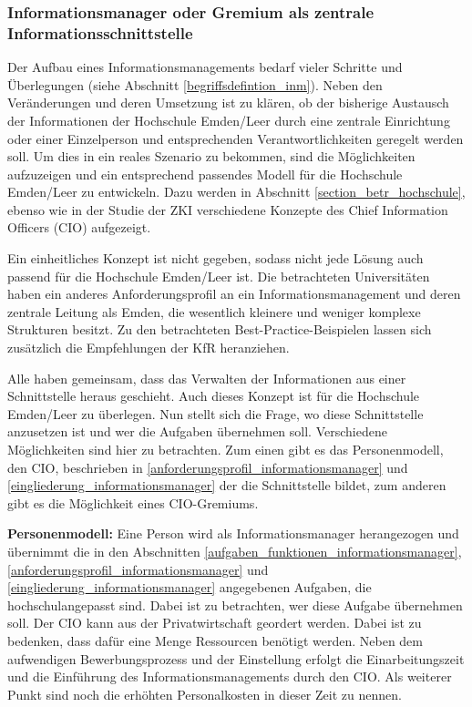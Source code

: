 \subsubsection{Informationsmanager oder Gremium als zentrale Informationsschnittstelle}
\label{subsubsection_cio_gremium}

Der Aufbau eines Informationsmanagements bedarf vieler Schritte und Überlegungen (siehe Abschnitt \ref{begriffsdefintion_inm}). Neben den Veränderungen und deren Umsetzung ist zu klären, ob der bisherige Austausch der Informationen der Hochschule Emden/Leer durch eine zentrale Einrichtung oder einer Einzelperson und entsprechenden Verantwortlichkeiten geregelt werden soll. Um dies in ein reales Szenario zu bekommen, sind die Möglichkeiten aufzuzeigen und ein entsprechend passendes Modell für die Hochschule Emden/Leer zu entwickeln. Dazu werden in Abschnitt  \ref{section_betr_hochschule}, ebenso wie in der Studie der ZKI verschiedene Konzepte des Chief Information Officers (CIO) aufgezeigt. 

Ein einheitliches Konzept ist nicht gegeben, sodass nicht jede Lösung auch passend für die Hochschule Emden/Leer ist. Die betrachteten Universitäten haben ein anderes Anforderungsprofil an ein Informationsmanagement und deren zentrale Leitung als Emden, die wesentlich kleinere und weniger komplexe Strukturen besitzt. Zu den betrachteten Best-Practice-Beispielen lassen sich zusätzlich die Empfehlungen der KfR heranziehen. 

Alle haben gemeinsam, dass das Verwalten der Informationen aus einer Schnittstelle heraus geschieht. Auch dieses Konzept ist für die Hochschule Emden/Leer zu überlegen. Nun stellt sich die Frage, wo diese Schnittstelle anzusetzen ist und wer die Aufgaben übernehmen soll. Verschiedene Möglichkeiten sind hier zu betrachten. Zum einen gibt es das Personenmodell, den CIO, beschrieben in \ref{anforderungsprofil_informationsmanager} und \ref{eingliederung_informationsmanager} der die Schnittstelle bildet, zum anderen gibt es die Möglichkeit eines CIO-Gremiums. 


\textbf{Personenmodell:\newline}
Eine Person wird als Informationsmanager herangezogen und übernimmt die in den Abschnitten \ref{aufgaben_funktionen_informationsmanager}, \ref{anforderungsprofil_informationsmanager} und \ref{eingliederung_informationsmanager} angegebenen Aufgaben, die hochschulangepasst sind. Dabei ist zu betrachten, wer diese Aufgabe übernehmen soll. Der CIO kann aus der Privatwirtschaft geordert werden. Dabei ist zu bedenken, dass dafür eine Menge Ressourcen benötigt werden. Neben dem aufwendigen Bewerbungsprozess und der Einstellung erfolgt die Einarbeitungszeit und die Einführung des Informationsmanagements durch den CIO. Als weiterer Punkt sind noch die erhöhten Personalkosten in dieser Zeit zu nennen.

